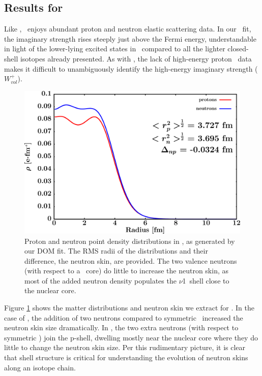 \subsection{Results for \niEight}
Like \caForty, \niEight\ enjoys abundant proton and neutron elastic scattering data.
In our \niEight\ fit, the imaginary strength rises steeply just above the Fermi energy,
understandable in light of the lower-lying excited states in \niEight\ compared to all the lighter
closed-shell isotopes already presented. As with \caEight, the lack of high-energy proton \rxn\ data
makes it difficult to unambiguously identify the high-energy imaginary strength ($W_{vol}^{+}$).

\begin{figure}[tb]
    \centering
    \includegraphics[width=\textwidth]{figures/ni58_matterDensity.png}
    \caption[Proton and neutron matter density distributions in \niEight]
    {
        Proton and neutron point density distributions in \niEight, as
        generated by our DOM fit. The RMS radii of the distributions and their
        difference, the neutron skin, are provided. The two valence neutrons (with respect to
        a \niSix\ core) do little to increase the neutron skin, as most of the added
        neutron density populates the $\nu$1\pThree\ shell close to the nuclear core.
    }
    \label{ni58MatterDistribution}
\end{figure}

Figure \ref{ni58MatterDistribution} shows the matter distributions and neutron skin we extract for 
\niEight. In the case of \oEight, the addition of two neutrons compared to symmetric \oSix\
increased the neutron skin size dramatically. In \niEight, the two extra neutrons (with respect to
symmetric \niSix) join the p-shell, dwelling mostly near the nuclear core where they do little
to change the neutron skin size. Per this rudimentary picture, it is clear that
shell structure is critical for understanding the evolution of neutron skins along an isotope chain. 

